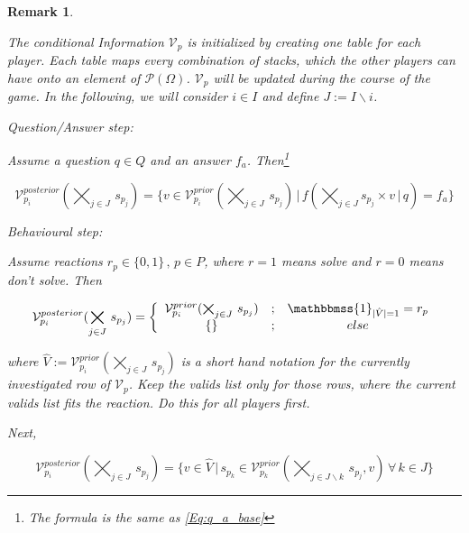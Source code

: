 \documentclass{article}
\newtheorem{remark}{Remark}[section]
\newcommand{\indik}{\mathbbmss{1}}
\begin{document}
\begin{remark}\label{re:BehaviourAnalysis}

The conditional Information $\mathcal{V}_p$ is initialized by creating one table for each player. Each table maps every combination of stacks, which the other players can have onto an element of $\mathcal{P}(\Omega)$. $\mathcal{V}_p$ will be updated during the course of the game. In the following, we will consider $i \in I$ and define $J := I \backslash i$.

Question/Answer step:

Assume a question $q \in Q$ and an answer $f_a$. Then\footnote{The formula is the same as \cref{Eq:q_a_base}}

\begin{equation}
\mathcal{V}_{p_i}^{posterior}(\bigtimes_{j \in J} \, s_{p_j}) = \{ v \in \mathcal{V}_{p_i}^{prior}(\bigtimes_{j \in J} \, s_{p_j}) \, | \, f(\bigtimes_{j \in J} s_{p_j} \times v \, | \, q) = f_a \}
\label{Eq:q_a}
\end{equation}

Behavioural step:

Assume reactions $r_p \in \{0, 1 \} \, , \, p \in P$, where $r=1$ means solve and $r=0$ means don't solve. Then

\begin{equation}
\mathcal{V}_{p_i}^{posterior}(\bigtimes_{j \in J} \, s_{p_j}) = \left \{ 
								 \begin{array}{ccc} 
																	 \mathcal{V}_{p_i}^{prior}(\bigtimes_{j \in J} \, s_{p_j}) & ; & \indik_{|\hat{V}| = 1} = r_p \\
																	 \{\} & ; & else
								 \end{array} \right.
\label{Eq:react_1}
\end{equation}

where $\hat{V} := \mathcal{V}_{p_i}^{prior}(\bigtimes_{j \in J} \, s_{p_j})$ is a short hand notation for the currently investigated row of $\mathcal{V}_p$. Keep the valids list only for those rows, where the current valids list fits the reaction. Do this for all players first.

Next,

\begin{equation}
\mathcal{V}_{p_i}^{posterior}(\bigtimes_{j \in J} \, s_{p_j}) = \{ v \in \hat{V} \, | \, s_{p_k} \in \mathcal{V}_{p_k}^{prior}(\bigtimes_{j \in J \backslash k} \, s_{p_j}, v) \, \forall \, k \in J \}
\label{Eq:react_2}
\end{equation}


\end{remark}
\end{document}
